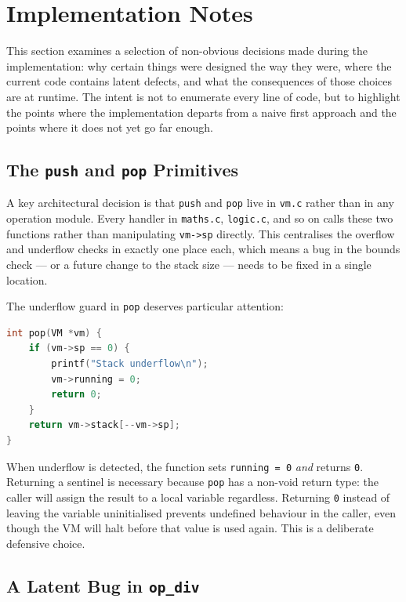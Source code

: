 \section{Implementation Notes}

This section examines a selection of non-obvious decisions made during the implementation: why certain things were designed the way they were, where the current code contains latent defects, and what the consequences of those choices are at runtime. The intent is not to enumerate every line of code, but to highlight the points where the implementation departs from a naive first approach and the points where it does not yet go far enough.

\subsection{The \texttt{push} and \texttt{pop} Primitives}

A key architectural decision is that \texttt{push} and \texttt{pop} live in \texttt{vm.c} rather than in any operation module. Every handler in \texttt{maths.c}, \texttt{logic.c}, and so on calls these two functions rather than manipulating \texttt{vm->sp} directly. This centralises the overflow and underflow checks in exactly one place each, which means a bug in the bounds check — or a future change to the stack size — needs to be fixed in a single location.

The underflow guard in \texttt{pop} deserves particular attention:

\begin{lstlisting}[language=C]
int pop(VM *vm) {
    if (vm->sp == 0) {
        printf("Stack underflow\n");
        vm->running = 0;
        return 0;
    }
    return vm->stack[--vm->sp];
}
\end{lstlisting}

When underflow is detected, the function sets \texttt{running = 0} \textit{and} returns \texttt{0}. Returning a sentinel is necessary because \texttt{pop} has a non-void return type: the caller will assign the result to a local variable regardless. Returning \texttt{0} instead of leaving the variable uninitialised prevents undefined behaviour in the caller, even though the VM will halt before that value is used again. This is a deliberate defensive choice.

\subsection{A Latent Bug in \texttt{op\_div}}

